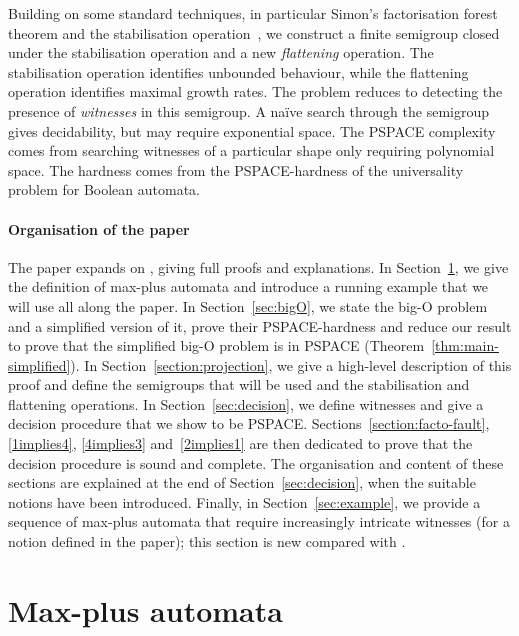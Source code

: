 \documentclass{lmcs}
\theoremstyle{remark}
\theoremstyle{remark}
\begin{document}
Building on some standard techniques, in particular Simon's factorisation forest theorem and the stabilisation operation~\cite{Simon90,Colcombet07,Kufleitner08,KirstenL09,FijalkowGKO15,ColcombetD13,CzerwinskiLMPW22}, we construct a finite semigroup closed under the stabilisation operation and a new \emph{flattening} operation. The stabilisation operation identifies unbounded behaviour, while the flattening operation identifies maximal growth rates. The problem reduces to detecting the presence of \emph{witnesses} in this semigroup. A naïve search through the semigroup gives decidability, but may require exponential space. The PSPACE complexity comes from searching witnesses of a particular shape only requiring polynomial space. The hardness comes from the PSPACE-hardness of the universality problem for Boolean automata.

\paragraph*{Organisation of the paper} The paper expands on \cite{DaviaudP23}, giving full proofs and explanations. In Section~\ref{sec:mpa}, we give the definition of max-plus automata and introduce a running example that we will use all along the paper. In Section~\ref{sec:bigO}, we state the big-O problem and a simplified version of it, prove their PSPACE-hardness and reduce our result to prove that the simplified big-O problem is in PSPACE (Theorem~\ref{thm:main-simplified}). In Section~\ref{section:projection}, we give a high-level description of this proof and define the semigroups that will be used and the stabilisation and flattening operations. In Section~\ref{sec:decision}, we define witnesses and give a decision procedure that we show to be PSPACE. Sections~\ref{section:facto-fault}, \ref{1implies4}, \ref{4implies3} and~\ref{2implies1} are then dedicated to prove that the decision procedure is sound and complete. The organisation and content of these sections are explained at the end of Section~\ref{sec:decision}, when the suitable notions have been introduced. Finally, in Section~\ref{sec:example}, we provide a sequence of max-plus automata that require increasingly intricate witnesses (for a notion defined in the paper); this section is new compared with \cite{DaviaudP23}.


\section{Max-plus automata}
\label{sec:mpa}
\end{document}
